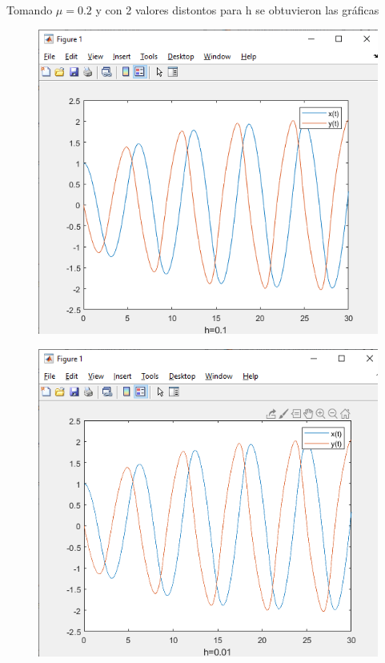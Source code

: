 \documentclass[12pt]{article}
\begin{document}
Tomando $\mu = 0.2$ y con 2 valores distontos para h se obtuvieron las gráficas
\begin{figure}[h]
	\centering
	\caption{}
	\includegraphics[scale=0.45]{graf5.png}
	\label{graf5}
\end{figure}
\begin{figure}[h]
	\centering
	\caption{}
	\includegraphics[scale=0.45]{graf6.png}
	\label{graf6}
\end{figure}\\
\end{document}
